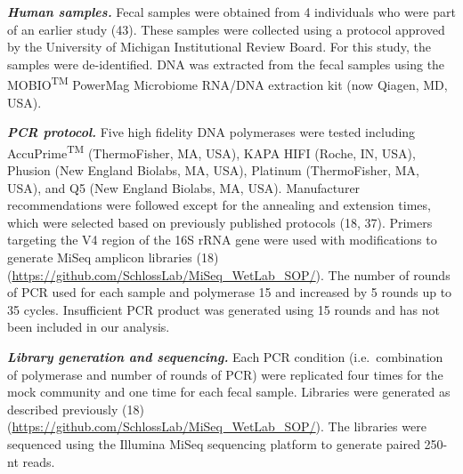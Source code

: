 \documentclass[11pt,]{article}
\begin{document}
\textbf{\emph{Human samples.}} Fecal samples were obtained from 4
individuals who were part of an earlier study (43). These samples were
collected using a protocol approved by the University of Michigan
Institutional Review Board. For this study, the samples were
de-identified. DNA was extracted from the fecal samples using the
MOBIO\textsuperscript{TM} PowerMag Microbiome RNA/DNA extraction kit
(now Qiagen, MD, USA).

\textbf{\emph{PCR protocol.}} Five high fidelity DNA polymerases were
tested including AccuPrime\textsuperscript{TM} (ThermoFisher, MA, USA),
KAPA HIFI (Roche, IN, USA), Phusion (New England Biolabs, MA, USA),
Platinum (ThermoFisher, MA, USA), and Q5 (New England Biolabs, MA, USA).
Manufacturer recommendations were followed except for the annealing and
extension times, which were selected based on previously published
protocols (18, 37). Primers targeting the V4 region of the 16S rRNA gene
were used with modifications to generate MiSeq amplicon libraries (18)
(\url{https://github.com/SchlossLab/MiSeq_WetLab_SOP/}). The number of
rounds of PCR used for each sample and polymerase 15 and increased by 5
rounds up to 35 cycles. Insufficient PCR product was generated using 15
rounds and has not been included in our analysis.

\textbf{\emph{Library generation and sequencing.}} Each PCR condition
(i.e.~combination of polymerase and number of rounds of PCR) were
replicated four times for the mock community and one time for each fecal
sample. Libraries were generated as described previously (18)
(\url{https://github.com/SchlossLab/MiSeq_WetLab_SOP/}). The libraries
were sequenced using the Illumina MiSeq sequencing platform to generate
paired 250-nt reads.
\end{document}
